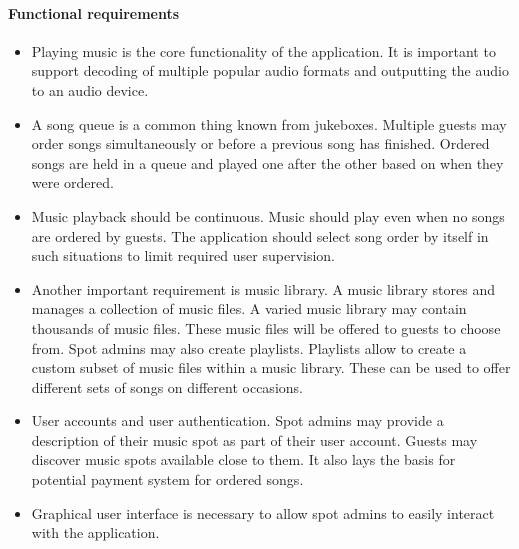 \paragraph{Functional requirements}
\begin{itemize}
    \item Playing music is the core functionality of the application. It is important to support decoding of multiple popular audio formats and outputting the audio to an audio device.
    \item A song queue is a common thing known from jukeboxes. Multiple guests may order songs simultaneously or before a previous song has finished. Ordered songs are held in a queue and played one after the other based on when they were ordered.
    \item Music playback should be continuous. Music should play even when no songs are ordered by guests. The application should select song order by itself in such situations to limit required user supervision.
    \item Another important requirement is music library. A music library stores and manages a collection of music files. A varied music library may contain thousands of music files. These music files will be offered to guests to choose from. Spot admins may also create playlists. Playlists allow to create a custom subset of music files within a music library. These can be used to offer different sets of songs on different occasions.
    \item User accounts and user authentication. Spot admins may provide a description of their music spot as part of their user account. Guests may discover music spots available close to them. It also lays the basis for potential payment system for ordered songs.
    \item Graphical user interface is necessary to allow spot admins to easily interact with the application.
\end{itemize}

